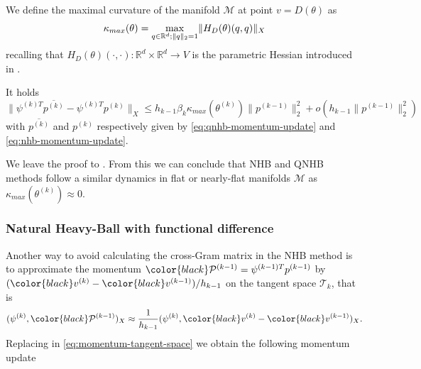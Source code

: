 \documentclass{article}
\theoremstyle{noparens}
\newcommand{\cT}{\mathcal{T}}
\newcommand{\cM}{\mathcal{M}}
\newcommand{\cP}{\mathcal{P}}
\newcommand{\R}{\mathbb{R}}
\newcommand{\colorM}{\color{black}}
\newcommand{\colorT}{\color{black}}
\newcommand{\paramk}{\theta^{(k)}}
\newcommand{\vk}{{\colorM v^{(k)}}}
\newcommand{\vkm}{{\colorM v^{(k-1)}}}
\newcommand{\psik}{\psi^{(k)}}
\newcommand{\psikT}{\psi^{(k)T}}
\newcommand{\psikmT}{\psi^{(k-1)T}}
\newcommand{\pk}{p^{(k)}}
\newcommand{\pkm}{p^{(k-1)}}
\newcommand{\Pkm}{{\colorT \cP^{(k-1)}}}
\begin{document}
We define the maximal curvature of the manifold $\cM$ at point $v=D(\theta)$ as
$$
\kappa_{max}(\theta) = \underset{q\in \R^d;\\ \|q\|_2=1}{\max} \|H_D(\theta)(q, q)\|_X
$$
recalling that $H_D(\theta)(\cdot, \cdot) : \mathbb{R}^d \times \mathbb{R}^d \to V$ is the parametric Hessian introduced in .
\begin{proposition}
\label{prop:qnhb}
It holds
$$
 \|\psikT \overline{\pk} -\psikT \pk \|_X\leq h_{k-1} \beta_k \kappa_{max}(\paramk) \|\pkm\|_2^2 +  o(h_{k-1} \|\pkm\|_2^2)
$$
with $\overline{\pk}$ and  $\pk$ respectively given by \eqref{eq:qnhb-momentum-update} and \eqref{eq:nhb-momentum-update}.
\end{proposition}
We leave the proof to . From this we can conclude that NHB and QNHB methods follow a similar dynamics in flat or nearly-flat manifolds $\cM$ as $\kappa_{max}(\paramk) \approx 0$.



\subsubsection{Natural Heavy-Ball with functional difference}
\label{sec:nhb-fd}

Another way to avoid calculating the cross-Gram matrix in the NHB method is to approximate the momentum $\Pkm=\psikmT \pkm$ by $(\vk-\vkm)/h_{k-1}$ on the tangent space $\cT_k$, that is
$$
({\psik, \Pkm})_X \approx \frac{1}{h_{k-1}}({\psik, \vk-\vkm})_X.
$$
Replacing in \eqref{eq:momentum-tangent-space} we obtain the following momentum update
\end{document}
